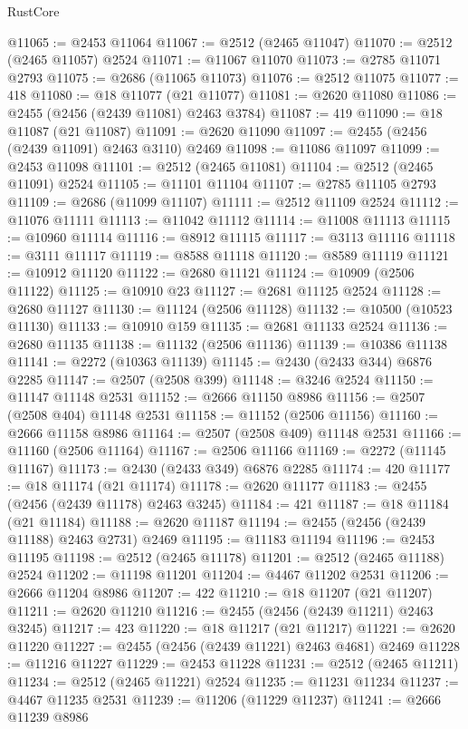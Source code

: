 \begin{lexlean}{RustCore}
\begin{coremodule}
@11065 := @2453 @11064
@11067 := @2512 (@2465 @11047)
@11070 := @2512 (@2465 @11057) @2524
@11071 := @11067 @11070
@11073 := @2785 @11071 @2793
@11075 := @2686 (@11065 @11073)
@11076 := @2512 @11075
@11077 := 418
@11080 := @18 @11077 (@21 @11077)
@11081 := @2620 @11080
@11086 := @2455 (@2456 (@2439 @11081) @2463 @3784)
@11087 := 419
@11090 := @18 @11087 (@21 @11087)
@11091 := @2620 @11090
@11097 := @2455 (@2456 (@2439 @11091) @2463 @3110) @2469
@11098 := @11086 @11097
@11099 := @2453 @11098
@11101 := @2512 (@2465 @11081)
@11104 := @2512 (@2465 @11091) @2524
@11105 := @11101 @11104
@11107 := @2785 @11105 @2793
@11109 := @2686 (@11099 @11107)
@11111 := @2512 @11109 @2524
@11112 := @11076 @11111
@11113 := @11042 @11112
@11114 := @11008 @11113
@11115 := @10960 @11114
@11116 := @8912 @11115
@11117 := @3113 @11116
@11118 := @3111 @11117
@11119 := @8588 @11118
@11120 := @8589 @11119
@11121 := @10912 @11120
@11122 := @2680 @11121
@11124 := @10909 (@2506 @11122)
@11125 := @10910 @23
@11127 := @2681 @11125 @2524
@11128 := @2680 @11127
@11130 := @11124 (@2506 @11128)
@11132 := @10500 (@10523 @11130)
@11133 := @10910 @159
@11135 := @2681 @11133 @2524
@11136 := @2680 @11135
@11138 := @11132 (@2506 @11136)
@11139 := @10386 @11138
@11141 := @2272 (@10363 @11139)
@11145 := @2430 (@2433 @344) @6876 @2285
@11147 := @2507 (@2508 @399)
@11148 := @3246 @2524
@11150 := @11147 @11148 @2531
@11152 := @2666 @11150 @8986
@11156 := @2507 (@2508 @404) @11148 @2531
@11158 := @11152 (@2506 @11156)
@11160 := @2666 @11158 @8986
@11164 := @2507 (@2508 @409) @11148 @2531
@11166 := @11160 (@2506 @11164)
@11167 := @2506 @11166
@11169 := @2272 (@11145 @11167)
@11173 := @2430 (@2433 @349) @6876 @2285
@11174 := 420
@11177 := @18 @11174 (@21 @11174)
@11178 := @2620 @11177
@11183 := @2455 (@2456 (@2439 @11178) @2463 @3245)
@11184 := 421
@11187 := @18 @11184 (@21 @11184)
@11188 := @2620 @11187
@11194 := @2455 (@2456 (@2439 @11188) @2463 @2731) @2469
@11195 := @11183 @11194
@11196 := @2453 @11195
@11198 := @2512 (@2465 @11178)
@11201 := @2512 (@2465 @11188) @2524
@11202 := @11198 @11201
@11204 := @4467 @11202 @2531
@11206 := @2666 @11204 @8986
@11207 := 422
@11210 := @18 @11207 (@21 @11207)
@11211 := @2620 @11210
@11216 := @2455 (@2456 (@2439 @11211) @2463 @3245)
@11217 := 423
@11220 := @18 @11217 (@21 @11217)
@11221 := @2620 @11220
@11227 := @2455 (@2456 (@2439 @11221) @2463 @4681) @2469
@11228 := @11216 @11227
@11229 := @2453 @11228
@11231 := @2512 (@2465 @11211)
@11234 := @2512 (@2465 @11221) @2524
@11235 := @11231 @11234
@11237 := @4467 @11235 @2531
@11239 := @11206 (@11229 @11237)
@11241 := @2666 @11239 @8986

\end{coremodule}
\end{lexlean}
